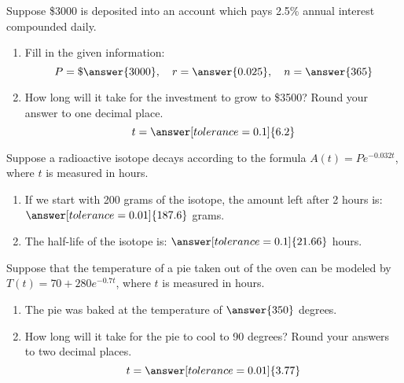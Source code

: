 \documentclass{ximera}
\begin{document}
 \begin{problem}\label{prob:160test3prob6}
 Suppose \$3000 is deposited into an account which pays 2.5\% annual interest compounded daily.  
 \begin{enumerate}
 \item Fill in the given information:
 $$P=\$\answer{3000},\quad r=\answer{0.025},\quad n=\answer{365}$$
 \item How long will it take for the investment to grow to \$3500?
 Round your answer to one decimal place.
 $$t=\answer[tolerance=0.1]{6.2}$$
 \end{enumerate}
 \end{problem}
 
 \begin{problem}\label{prob:160test3prob7}
 Suppose a radioactive isotope decays according to the formula $A(t)=Pe^{-0.032t}$, where $t$ is measured in hours.  
 \begin{enumerate}
     \item 
If we start with 200 grams of the isotope, the amount left after 2 hours is: $\answer[tolerance=0.01]{187.6}$ grams.
\item The half-life of the isotope is: $\answer[tolerance=0.1]{21.66}$ hours.
\end{enumerate}
 \end{problem}
 
 \begin{problem}\label{prob:160test3prob8}
 Suppose that the temperature of a pie taken out of the oven can be modeled by $T(t)=70+280e^{-0.7t}$, where $t$ is measured in hours.
 \begin{enumerate}
     \item The pie was baked at the temperature of $\answer{350}$ degrees.
     \item How long will it take for the pie to cool to 90 degrees?  Round your answers to two decimal places.
     $$t=\answer[tolerance=0.01]{3.77}$$
 \end{enumerate}
 \end{problem}
 
 
\end{document}
